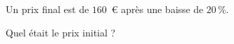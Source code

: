 
Un prix final est de $160$~€ après une baisse de $20\,\%$.

Quel était le prix initial ?

\smallskip

